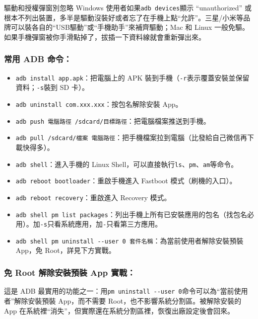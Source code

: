 \begin{tcbwarn}{驅動和授權彈窗別忽略}
Windows 使用者如果\texttt{adb devices}顯示 “unauthorized” 或根本不列出裝置，多半是驅動沒裝好或者忘了在手機上點“允許”。三星/小米等品牌可以裝各自的“USB驅動”或“手機助手”來補齊驅動；Mac 和 Linux 一般免驅。如果手機彈窗被你手滑點掉了，拔插一下資料線就會重新彈出來。

\end{tcbwarn}

\subsubsection*{常用 ADB 命令：}

\begin{itemize}
  \item \texttt{adb install app.\allowbreak apk}：把電腦上的 APK 裝到手機（\texttt{-\allowbreak r}表示覆蓋安裝並保留資料；\texttt{-\allowbreak s}裝到 SD 卡）。
  \item \texttt{adb uninstall com.\allowbreak xxx.\allowbreak xxx}：按包名解除安裝 App。
  \item \texttt{adb push 電腦路徑 /\allowbreak sdcard/\allowbreak 目標路徑}：把電腦檔案推送到手機。
  \item \texttt{adb pull /\allowbreak sdcard/\allowbreak 檔案 電腦路徑}：把手機檔案拉到電腦（比發給自己微信再下載快得多）。
  \item \texttt{adb shell}：進入手機的 Linux Shell，可以直接執行\texttt{ls}、\texttt{pm}、\texttt{am}等命令。
  \item \texttt{adb reboot bootloader}：重啟手機進入 Fastboot 模式（刷機的入口）。
  \item \texttt{adb reboot recovery}：重啟進入 Recovery 模式。
  \item \texttt{adb shell pm list packages}：列出手機上所有已安裝應用的包名（找包名必用）。加\texttt{-\allowbreak s}只看系統應用，加\texttt{-}只看第三方應用。
  \item \texttt{adb shell pm uninstall -\allowbreak -\allowbreak user 0 套件名稱}：為當前使用者解除安裝預裝 App，免 Root，詳見下方實戰。
\end{itemize}

\subsubsection*{免 Root 解除安裝預裝 App 實戰：}

這是 ADB 最實用的功能之一：用\texttt{pm uninstall -\allowbreak -\allowbreak user 0}命令可以為“當前使用者”解除安裝預裝 App，而不需要 Root，也不影響系統分割區。被解除安裝的 App 在系統裡“消失”，但實際還在系統分割區裡，恢復出廠設定後會回來。

